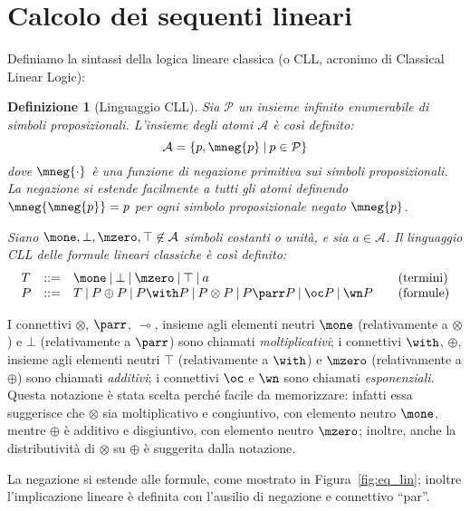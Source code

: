 \documentclass[12pt,a4paper,openright,twoside]{report}
\newtheorem{dfn}[thm]{Definizione}
\begin{document}
\section{Calcolo dei sequenti lineari}

Definiamo la sintassi della logica lineare classica (o \textsf{CLL}, acronimo di Classical Linear Logic):

\begin{dfn}[Linguaggio \textsf{CLL}] Sia $\mathcal{P}$ un insieme infinito enumerabile di \emph{simboli proposizionali}. L'insieme degli \emph{atomi} $\mathcal{A}$ \`e cos\`i definito:
$$
	\mathcal{A} = \{ p, \mneg{p} \:|\: p \in \mathcal{P} \}
$$
dove $\mneg{\cdot}$ \`e una \emph{funzione di negazione primitiva sui simboli proposizionali}. La negazione si estende facilmente a tutti gli atomi definendo $\mneg{\mneg{p}} = p$ per ogni simbolo proposizionale negato $\mneg{p}$.

Siano $\mone, \bot, \mzero, \top \not\in \mathcal{A}$ simboli costanti o \emph{unit\`a}, e sia $a \in \mathcal{A}$. Il \emph{linguaggio \textsf{CLL} delle formule lineari classiche} \`e cos\`i definito:
$$
\begin{array}{llll}
	T & ::= & \mone \:|\: \bot \:|\: \mzero \:|\: \top \:|\: a & \quad\mbox{(termini)} \\
	P & ::= & T \:|\: P \oplus P \:|\: P \with P \:|\: P \otimes P \:|\: P \parr P \:|\: \oc P \:|\: \wn P & \quad\mbox{(formule)} 
\end{array}
$$
\end{dfn}
I connettivi $\otimes$, $\parr$, $\multimap$, insieme agli elementi neutri $\mone$ (relativamente a $\otimes$) e $\bot$ (relativamente a $\parr$) sono chiamati \emph{moltiplicativi}; i connettivi $\with$, $\oplus$, insieme agli elementi neutri $\top$ (relativamente a $\with$) e $\mzero$ (relativamente a $\oplus$) sono chiamati \emph{additivi}; i connettivi $\oc$ e $\wn$ sono chiamati \emph{esponenziali}. Questa notazione \`e stata scelta perch\'e facile da memorizzare: infatti essa suggerisce che $\otimes$ sia moltiplicativo e congiuntivo, con elemento neutro $\mone$, mentre $\oplus$ \`e additivo e disgiuntivo, con elemento neutro $\mzero$; inoltre, anche la distributivit\`a di $\otimes$ su $\oplus$ \`e suggerita dalla notazione.

La negazione si estende alle formule, come mostrato in Figura~\ref{fig:eq_lin}; inoltre l'implicazione lineare \`e definita con l'ausilio di negazione e connettivo ``par''.
\end{document}
